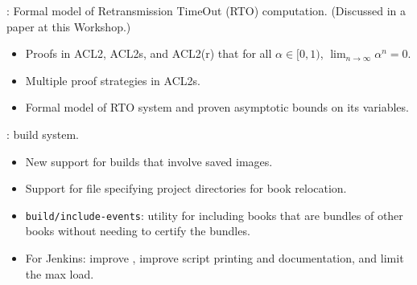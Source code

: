 
\begin{frame}

\newlibtitle

:
Formal model of Retransmission TimeOut (RTO) computation.
(Discussed in a paper at this Workshop.)
\begin{itemize}
\item Proofs in ACL2, ACL2s, and ACL2(r) that for all $\alpha \in [0, 1)$,
      $\lim_{n\to\infty}\alpha^n = 0$.
\item Multiple proof strategies in ACL2s.
\item Formal model of RTO system and proven asymptotic bounds on its variables.
\end{itemize}

\end{frame}


\begin{frame}

\implibtitle

:
 build system.
\begin{itemize}
\item New support for builds that involve saved images.
\item Support for  file specifying project directories for book relocation.
\item \texttt{build/include-events}: utility for including books that
  are bundles of other books without needing to certify the bundles.
\item For Jenkins: improve , improve script printing and documentation, and limit the max load.
\end{itemize}

\end{frame}


